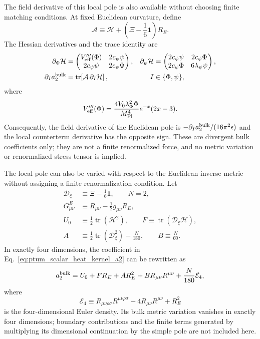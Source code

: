 \documentclass[epj]{svjour}
\begin{document}
The field derivative of this local pole is also available without
choosing finite matching conditions. At fixed Euclidean curvature,
define
\begin{equation}
\mathcal A\equiv\mathcal H+
\left(\Xi-\frac16\mathbf1\right)R_E.
\end{equation}
The Hessian derivatives and the trace identity are
\begin{align}
\partial_\Phi\mathcal H
&=
\begin{pmatrix}
V_{\rm eff}'''(\Phi)&2c_\psi\psi\\
2c_\psi\psi&2c_\psi\Phi
\end{pmatrix},
&
\partial_\psi\mathcal H
&=
\begin{pmatrix}
2c_\psi\psi&2c_\psi\Phi\\
2c_\psi\Phi&6\lambda_\psi\psi
\end{pmatrix},
\nonumber\\
\partial_I a_2^{\rm bulk}
&=\operatorname{tr}\!\left[
\mathcal A\,\partial_I\mathcal H
\right],
&
I&\in\{\Phi,\psi\},
\label{eq:ptum_scalar_heat_kernel_field_derivatives}
\end{align}
where
\begin{equation}
V_{\rm eff}'''(\Phi)=
\frac{4V_0\lambda_\Phi^2\Phi}{M_{\rm Pl}^4}
e^{-x}(2x-3).
\end{equation}
Consequently, the field derivative of the Euclidean pole is
$-\partial_I a_2^{\rm bulk}/(16\pi^2\epsilon)$ and the local
counterterm derivative has the opposite sign. These are divergent
bulk coefficients only; they are not a finite renormalized force,
and no metric variation or renormalized stress tensor is implied.




The local pole can also be varied with respect to the Euclidean inverse
metric without assigning a finite renormalization condition.  Let
\begin{equation}
\begin{aligned}
\mathcal D_\xi&\equiv\Xi-\frac16\mathbf1,\qquad N=2,\\
G_{\mu\nu}^{E}&\equiv R_{\mu\nu}-\frac12g_{\mu\nu}R_E,\\
U_0&\equiv\frac12\operatorname{tr}(\mathcal H^2),\qquad
F\equiv\operatorname{tr}(\mathcal D_\xi\mathcal H),\\
A&\equiv\frac12\operatorname{tr}(\mathcal D_\xi^2)-\frac{N}{180},
\qquad B\equiv\frac{N}{60}.
\end{aligned}
\end{equation}
In exactly four dimensions, the coefficient in
Eq.~\eqref{eq:ptum_scalar_heat_kernel_a2} can be rewritten as
\begin{equation}
a_2^{\rm bulk}
=U_0+F R_E+A R_E^2+B R_{\mu\nu}R^{\mu\nu}
+\frac{N}{180}\mathcal E_4,
\end{equation}
where
\begin{equation}
\mathcal E_4\equiv
R_{\mu\nu\rho\sigma}R^{\mu\nu\rho\sigma}
-4R_{\mu\nu}R^{\mu\nu}+R_E^2
\end{equation}
is the four-dimensional Euler density.  Its bulk metric variation
vanishes in exactly four dimensions; boundary contributions and the
finite terms generated by multiplying its dimensional continuation by
the simple pole are not included here.
\end{document}
